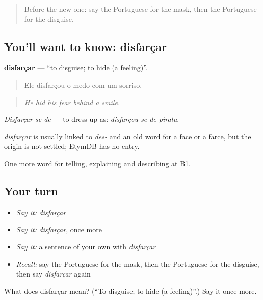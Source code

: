 \label{lesson:PT-C321-disfarcar}



\begin{quote}
Before the new one: say the Portuguese for the mask, then the Portuguese for the disguise.
\end{quote}

\subsection*{You'll want to know: disfarçar}
\textbf{disfarçar} — \textquotedblleft{}to disguise; to hide (a feeling)\textquotedblright{}.

\begin{quote}
Ele disfarçou o medo com um sorriso.
\end{quote}

\begin{quote}
\emph{He hid his fear behind a smile.}
\end{quote}

\emph{Disfarçar-se de} — to dress up as: \emph{disfarçou-se de pirata}.

\begin{cousinweb}
\emph{disfarçar} is usually linked to \emph{des-} and an old word for a face or a farce, but the origin is not settled; EtymDB has no entry.
\end{cousinweb}

\begin{grammarlens}[title={What you've built}]
One more word for telling, explaining and describing at B1.
\end{grammarlens}

\subsection*{Your turn}
\begin{itemize}
\raggedright
  \item \emph{Say it:} \emph{disfarçar}
  \item \emph{Say it:} \emph{disfarçar}, once more
  \item \emph{Say it:} a sentence of your own with \emph{disfarçar}
  \item \emph{Recall:} say the Portuguese for the mask, then the Portuguese for the disguise, then say \emph{disfarçar} again
\end{itemize}

\begin{tcolorbox}[breakable,colback=teal!4,colframe=teal!35!black,title={Before you move on}]
What does disfarçar mean? (\textquotedblleft{}To disguise; to hide (a feeling)\textquotedblright{}.) Say it once more.
\end{tcolorbox}
